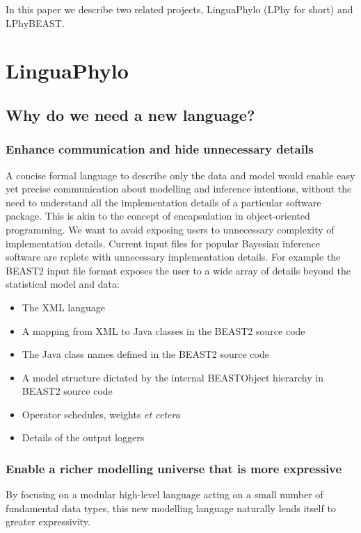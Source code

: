 \documentclass[oneside]{article}
\begin{document}
In this paper we describe two related projects, LinguaPhylo (LPhy for
short) and LPhyBEAST.

\section{LinguaPhylo}

\subsection{Why do we need a new language?}


\subsubsection{Enhance communication and hide unnecessary details}

A concise formal language to describe only the data and model would enable easy yet precise communication about modelling and inference intentions, without the need to understand all the implementation details of a particular software package. This is akin to the concept of encapsulation in object-oriented programming. We want to avoid exposing users to unnecessary complexity of implementation details.
Current input files for popular Bayesian inference software are replete with unnecessary implementation details.
For example the BEAST2 input file format exposes the user to a wide array of details beyond the statistical model and data:
\begin{itemize}
\item The XML language
\item A mapping from XML to Java classes in the BEAST2 source code
\item The Java class names defined in the BEAST2 source code
\item A model structure dictated by the internal BEASTObject hierarchy in BEAST2 source code
\item Operator schedules, weights {\it et cetera}
\item Details of the output loggers
\end{itemize}

\subsubsection{Enable a richer modelling universe that is more expressive}

By focusing on a modular high-level language acting on a small number of fundamental data types, this new modelling language naturally lends itself to greater expressivity.
\end{document}
